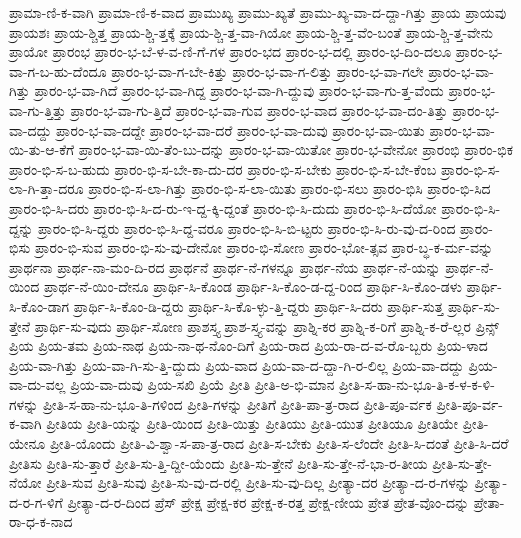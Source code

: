 {ಪ್ರಾಮಾ-ಣಿ-ಕ-ವಾಗಿ
ಪ್ರಾಮಾ-ಣಿ-ಕ-ವಾದ
ಪ್ರಾಮುಖ್ಯ
ಪ್ರಾಮು-ಖ್ಯತೆ
ಪ್ರಾಮು-ಖ್ಯ-ವಾ-ದ-ದ್ದಾ-ಗಿತ್ತು
ಪ್ರಾಯ
ಪ್ರಾಯವು
ಪ್ರಾಯಶಃ
ಪ್ರಾಯ-ಶ್ಚಿತ್ತ
ಪ್ರಾಯ-ಶ್ಚಿ-ತ್ತಕ್ಕೆ
ಪ್ರಾಯ-ಶ್ಚಿ-ತ್ತ-ವಾ-ಗಿಯೋ
ಪ್ರಾಯ-ಶ್ಚಿ-ತ್ತ-ವೆಂ-ಬಂತೆ
ಪ್ರಾಯ-ಶ್ಚಿ-ತ್ತ-ವೇನು
ಪ್ರಾಯೋ
ಪ್ರಾರಂಭ
ಪ್ರಾರಂ-ಭ-ಬೆ-ಳ-ವ-ಣಿ-ಗೆ-ಗಳ
ಪ್ರಾರಂ-ಭದ
ಪ್ರಾರಂ-ಭ-ದಲ್ಲಿ
ಪ್ರಾರಂ-ಭ-ದಿಂ-ದಲೂ
ಪ್ರಾರಂ-ಭ-ವಾ-ಗ-ಬ-ಹು-ದೆಂದೂ
ಪ್ರಾರಂ-ಭ-ವಾ-ಗ-ಬೇ-ಕಿತ್ತು
ಪ್ರಾರಂ-ಭ-ವಾ-ಗ-ಲಿತ್ತು
ಪ್ರಾರಂ-ಭ-ವಾ-ಗಲೇ
ಪ್ರಾರಂ-ಭ-ವಾ-ಗಿತ್ತು
ಪ್ರಾರಂ-ಭ-ವಾ-ಗಿದೆ
ಪ್ರಾರಂ-ಭ-ವಾ-ಗಿದ್ದ
ಪ್ರಾರಂ-ಭ-ವಾ-ಗಿ-ದ್ದುವು
ಪ್ರಾರಂ-ಭ-ವಾ-ಗು-ತ್ತ-ವೆಂದು
ಪ್ರಾರಂ-ಭ-ವಾ-ಗು-ತ್ತಿತ್ತು
ಪ್ರಾರಂ-ಭ-ವಾ-ಗು-ತ್ತಿದೆ
ಪ್ರಾರಂ-ಭ-ವಾ-ಗುವ
ಪ್ರಾರಂ-ಭ-ವಾದ
ಪ್ರಾರಂ-ಭ-ವಾ-ದಂ-ತಿತ್ತು
ಪ್ರಾರಂ-ಭ-ವಾ-ದದ್ದು
ಪ್ರಾರಂ-ಭ-ವಾ-ದದ್ದೇ
ಪ್ರಾರಂ-ಭ-ವಾ-ದರೆ
ಪ್ರಾರಂ-ಭ-ವಾ-ದುವು
ಪ್ರಾರಂ-ಭ-ವಾ-ಯಿತು
ಪ್ರಾರಂ-ಭ-ವಾ-ಯಿ-ತು-ಆ-ಕೆಗೆ
ಪ್ರಾರಂ-ಭ-ವಾ-ಯಿ-ತೆಂ-ಬು-ದನ್ನು
ಪ್ರಾರಂ-ಭ-ವಾ-ಯಿತೋ
ಪ್ರಾರಂ-ಭ-ವೇನೋ
ಪ್ರಾರಂಭಿ
ಪ್ರಾರಂ-ಭಿಕ
ಪ್ರಾರಂ-ಭಿ-ಸ-ಬ-ಹುದು
ಪ್ರಾರಂ-ಭಿ-ಸ-ಬೇ-ಕಾ-ದು-ದರ
ಪ್ರಾರಂ-ಭಿ-ಸ-ಬೇಕು
ಪ್ರಾರಂ-ಭಿ-ಸ-ಬೇ-ಕೆಂಬ
ಪ್ರಾರಂ-ಭಿ-ಸ-ಲಾ-ಗಿ-ತ್ತಾ-ದರೂ
ಪ್ರಾರಂ-ಭಿ-ಸ-ಲಾ-ಗಿತ್ತು
ಪ್ರಾರಂ-ಭಿ-ಸ-ಲಾ-ಯಿತು
ಪ್ರಾರಂ-ಭಿ-ಸಲು
ಪ್ರಾರಂ-ಭಿಸಿ
ಪ್ರಾರಂ-ಭಿ-ಸಿದ
ಪ್ರಾರಂ-ಭಿ-ಸಿ-ದರು
ಪ್ರಾರಂ-ಭಿ-ಸಿ-ದ-ರು-ಇ-ದ್ದ-ಕ್ಕಿ-ದ್ದಂತೆ
ಪ್ರಾರಂ-ಭಿ-ಸಿ-ದುದು
ಪ್ರಾರಂ-ಭಿ-ಸಿ-ದೆಯೋ
ಪ್ರಾರಂ-ಭಿ-ಸಿ-ದ್ದನ್ನು
ಪ್ರಾರಂ-ಭಿ-ಸಿ-ದ್ದರು
ಪ್ರಾರಂ-ಭಿ-ಸಿ-ದ್ದ-ವರೂ
ಪ್ರಾರಂ-ಭಿ-ಸಿ-ಬಿ-ಟ್ಟರು
ಪ್ರಾರಂ-ಭಿ-ಸಿ-ರು-ವು-ದ-ರಿಂದ
ಪ್ರಾರಂ-ಭಿಸು
ಪ್ರಾರಂ-ಭಿ-ಸುವ
ಪ್ರಾರಂ-ಭಿ-ಸು-ವು-ದೇನೋ
ಪ್ರಾರಂ-ಭಿ-ಸೋಣ
ಪ್ರಾರಂ-ಭೋ-ತ್ಸವ
ಪ್ರಾರ-ಬ್ಧ-ಕ-ರ್ಮ-ವನ್ನು
ಪ್ರಾರ್ಥನಾ
ಪ್ರಾರ್ಥ-ನಾ-ಮಂ-ದಿ-ರದ
ಪ್ರಾರ್ಥನೆ
ಪ್ರಾರ್ಥ-ನೆ-ಗಳನ್ನೂ
ಪ್ರಾರ್ಥ-ನೆಯ
ಪ್ರಾರ್ಥ-ನೆ-ಯನ್ನು
ಪ್ರಾರ್ಥ-ನೆ-ಯಿಂದ
ಪ್ರಾರ್ಥ-ನೆ-ಯಿಂ-ದೇನೂ
ಪ್ರಾರ್ಥಿ-ಸಿ-ಕೊಂಡ
ಪ್ರಾರ್ಥಿ-ಸಿ-ಕೊಂ-ಡ-ದ್ದ-ರಿಂದ
ಪ್ರಾರ್ಥಿ-ಸಿ-ಕೊಂ-ಡಳು
ಪ್ರಾರ್ಥಿ-ಸಿ-ಕೊಂ-ಡಾಗ
ಪ್ರಾರ್ಥಿ-ಸಿ-ಕೊಂ-ಡಿ-ದ್ದರು
ಪ್ರಾರ್ಥಿ-ಸಿ-ಕೊ-ಳ್ಳು-ತ್ತಿ-ದ್ದರು
ಪ್ರಾರ್ಥಿ-ಸಿ-ದರು
ಪ್ರಾರ್ಥಿ-ಸುತ್ತ
ಪ್ರಾರ್ಥಿ-ಸು-ತ್ತೇನೆ
ಪ್ರಾರ್ಥಿ-ಸು-ವುದು
ಪ್ರಾರ್ಥಿ-ಸೋಣ
ಪ್ರಾಶಸ್ತ್ಯ
ಪ್ರಾಶ-ಸ್ತ್ಯ-ವನ್ನು
ಪ್ರಾಶ್ನಿ-ಕರ
ಪ್ರಾಶ್ನಿ-ಕ-ರಿಗೆ
ಪ್ರಾಶ್ನಿ-ಕ-ರೆ-ಲ್ಲರ
ಪ್ರಿನ್ಸ್
ಪ್ರಿಯ
ಪ್ರಿಯ-ತಮ
ಪ್ರಿಯ-ನಾಥ
ಪ್ರಿಯ-ನಾ-ಥ-ನೊಂ-ದಿಗೆ
ಪ್ರಿಯ-ರಾದ
ಪ್ರಿಯ-ರಾ-ದ-ವ-ರೊ-ಬ್ಬರು
ಪ್ರಿಯ-ಳಾದ
ಪ್ರಿಯ-ವಾ-ಗಿತ್ತು
ಪ್ರಿಯ-ವಾ-ಗಿ-ಸು-ತ್ತಿ-ದ್ದುದು
ಪ್ರಿಯ-ವಾದ
ಪ್ರಿಯ-ವಾ-ದ-ದ್ದಾ-ಗಿ-ರ-ಲಿಲ್ಲ
ಪ್ರಿಯ-ವಾ-ದದ್ದು
ಪ್ರಿಯ-ವಾ-ದು-ವಲ್ಲ
ಪ್ರಿಯ-ವಾ-ದುವು
ಪ್ರಿಯ-ಸಖಿ
ಪ್ರಿಯೆ
ಪ್ರೀತಿ
ಪ್ರೀತಿ-ಅ-ಭಿ-ಮಾನ
ಪ್ರೀತಿ-ಸ-ಹಾ-ನು-ಭೂ-ತಿ-ಕ-ಳ-ಕ-ಳಿ-ಗಳನ್ನು
ಪ್ರೀತಿ-ಸ-ಹಾ-ನು-ಭೂ-ತಿ-ಗಳಿಂದ
ಪ್ರೀತಿ-ಗಳನ್ನು
ಪ್ರೀತಿಗೆ
ಪ್ರೀತಿ-ಪಾ-ತ್ರ-ರಾದ
ಪ್ರೀತಿ-ಪೂ-ರ್ವಕ
ಪ್ರೀತಿ-ಪೂ-ರ್ವ-ಕ-ವಾಗಿ
ಪ್ರೀತಿಯ
ಪ್ರೀತಿ-ಯನ್ನು
ಪ್ರೀತಿ-ಯಿಂದ
ಪ್ರೀತಿ-ಯಿತ್ತು
ಪ್ರೀತಿಯು
ಪ್ರೀತಿ-ಯುತ
ಪ್ರೀತಿಯೂ
ಪ್ರೀತಿಯೇ
ಪ್ರೀತಿ-ಯೇನೂ
ಪ್ರೀತಿ-ಯೊಂದು
ಪ್ರೀತಿ-ವಿ-ಶ್ವಾ-ಸ-ಪಾ-ತ್ರ-ರಾದ
ಪ್ರೀತಿ-ಸ-ಬೇಕು
ಪ್ರೀತಿ-ಸ-ಲೆಂದೇ
ಪ್ರೀತಿ-ಸಿ-ದಂತೆ
ಪ್ರೀತಿ-ಸಿ-ದರೆ
ಪ್ರೀತಿಸು
ಪ್ರೀತಿ-ಸು-ತ್ತಾರೆ
ಪ್ರೀತಿ-ಸು-ತ್ತಿ-ದ್ದೀ-ಯೆಂದು
ಪ್ರೀತಿ-ಸು-ತ್ತೇನೆ
ಪ್ರೀತಿ-ಸು-ತ್ತೇ-ನೆ-ಭಾ-ರ-ತೀಯ
ಪ್ರೀತಿ-ಸು-ತ್ತೇ-ನೆಯೋ
ಪ್ರೀತಿ-ಸುವ
ಪ್ರೀತಿ-ಸುವು
ಪ್ರೀತಿ-ಸು-ವು-ದ-ರಲ್ಲಿ
ಪ್ರೀತಿ-ಸು-ವು-ದಿಲ್ಲ
ಪ್ರೀತ್ಯಾ-ದರ
ಪ್ರೀತ್ಯಾ-ದ-ರ-ಗಳನ್ನು
ಪ್ರೀತ್ಯಾ-ದ-ರ-ಗ-ಳಿಗೆ
ಪ್ರೀತ್ಯಾ-ದ-ರ-ದಿಂದ
ಪ್ರೆಸ್
ಪ್ರೇಕ್ಷ
ಪ್ರೇಕ್ಷ-ಕರ
ಪ್ರೇಕ್ಷ-ಕ-ರತ್ತ
ಪ್ರೇಕ್ಷ-ಣೀಯ
ಪ್ರೇತ
ಪ್ರೇತ-ವೊಂ-ದನ್ನು
ಪ್ರೇತಾ-ರಾ-ಧ-ಕ-ನಾದ
}
